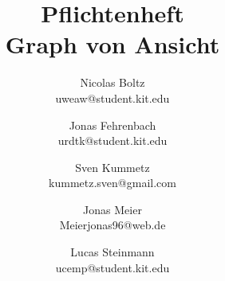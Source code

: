 \documentclass[a4paper]{scrreprt}
\begin{document}
\title{Pflichtenheft\\
Graph von Ansicht}
\date{}
\author{Nicolas Boltz   \\ uweaw@student.kit.edu
  \and Jonas Fehrenbach \\ urdtk@student.kit.edu
  \and Sven Kummetz     \\ kummetz.sven@gmail.com
  \and Jonas Meier      \\ Meierjonas96@web.de
  \and Lucas Steinmann  \\ ucemp@student.kit.edu
}

\titlehead{\texttt{[image: resourcen/GAns.png]}}

\maketitle


\tableofcontents





















\clearpage
\printglossary[type=\acronymtype]
\printglossary[title=Glossar,toctitle=Glossar]

\listoffigures
\end{document}
